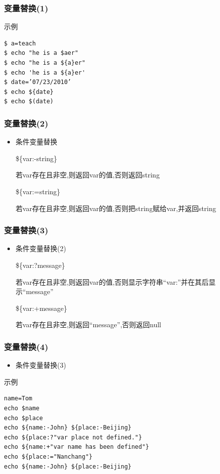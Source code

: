 \documentclass[xcolor=svgnames,presentation]{beamer}
\begin{document}
\begin{frame}[fragile]
\frametitle{变量替换(1)}
\label{sec-1-2-9}
\begin{exampleblock}{示例}
\label{sec-1-2-9-1}


\begin{verbatim}
$ a=teach
$ echo "he is a $aer"
$ echo "he is a ${a}er"
$ echo 'he is a ${a}er'
$ date=’07/23/2010’
$ echo ${date}
$ echo $(date)
\end{verbatim}
\end{exampleblock}
\end{frame}
\begin{frame}
\frametitle{变量替换(2)}
\label{sec-1-2-10}
\begin{itemize}

\item 条件变量替换
\label{sec-1-2-10-1}%
\begin{exampleblock}{\$\{var:-string\}}
\label{sec-1-2-10-1-1}

若var存在且非空,则返回var的值,否则返回string
\end{exampleblock}
\begin{block}{\$\{var:=string\}}
\label{sec-1-2-10-1-2}

若var存在且非空,则返回var的值,否则把string赋给var,并返回string
\end{block}
\end{itemize} %
\end{frame}
\begin{frame}
\frametitle{变量替换(3)}
\label{sec-1-2-11}
\begin{itemize}

\item 条件变量替换(2)
\label{sec-1-2-11-1}%
\begin{exampleblock}{\$\{var:?message\}}
\label{sec-1-2-11-1-1}

若var存在且非空,则返回var的值,否则显示字符串“var:”并在其后显示“message”
\end{exampleblock}
\begin{block}{\$\{var:+message\}}
\label{sec-1-2-11-1-2}

若var存在且非空,则返回“message”,否则返回null
\end{block}
\end{itemize} %
\end{frame}
\begin{frame}[fragile]
\frametitle{变量替换(4)}
\label{sec-1-2-12}
\begin{itemize}

\item 条件变量替换(3)
\label{sec-1-2-12-1}%
\end{itemize} %
\begin{exampleblock}{示例}
\label{sec-1-2-12-2}


\begin{verbatim}
name=Tom
echo $name
echo $place
echo ${name:-John} ${place:-Beijing}
echo ${place:?"var place not defined."}
echo ${name:+"var name has been defined"}
echo ${place:="Nanchang"}
echo ${name:-John} ${place:-Beijing}
\end{verbatim}
\end{exampleblock}
\end{frame}
\end{document}
